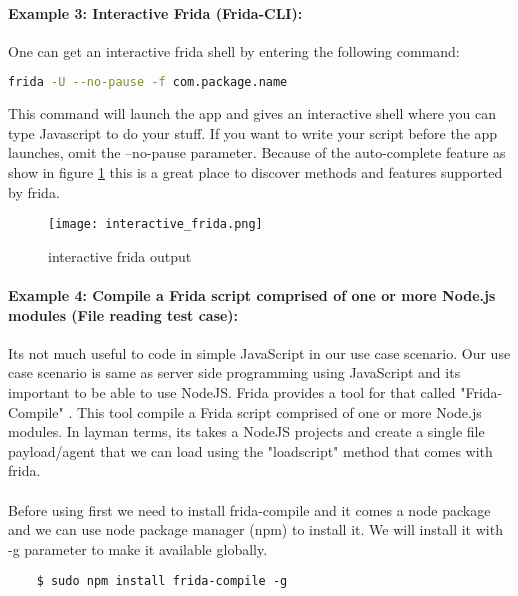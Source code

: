 \documentclass[../main.tex]{subfile}
\begin{document}
	
	\paragraph{Example 3: Interactive Frida (Frida-CLI):}
	One can get an interactive frida shell by entering the following command:
	\begin{lstlisting}[language=bash]
		frida -U --no-pause -f com.package.name
	\end{lstlisting}
	This command will launch the app and gives an interactive shell where you can type Javascript to do your stuff. If you want to write your
	script before the app launches, omit the --no-pause parameter. Because of the auto-complete feature as show in figure \ref{fig:interactive_frida} this is a great place to discover methods and features supported by frida.
	\begin{figure}[h]
		\texttt{[image: interactive\_frida.png]}
		\caption{interactive frida output }
		\label{fig:interactive_frida}
	\end{figure}

	\paragraph{Example 4: Compile a Frida script comprised of one or more Node.js modules (File reading test case):} Its not much useful to code in simple JavaScript in our use case scenario. Our use case scenario is same as server side programming using JavaScript and its important to be able to use NodeJS. Frida provides a tool for that called "Frida-Compile" \cite{frida_compile}. This tool compile a Frida script comprised of one or more Node.js modules. In layman terms, its takes a NodeJS projects and create a single file payload/agent that we can load using the "load\textunderscore script" method that comes with frida.
	\paragraph{} Before using first we need to install frida-compile and it comes a node package and we can use node package manager (npm) to install it. We will install it with -g parameter to make it available globally.
	\begin{lstlisting}
	$ sudo npm install frida-compile -g
	\end{lstlisting}
	
	
\end{document}
